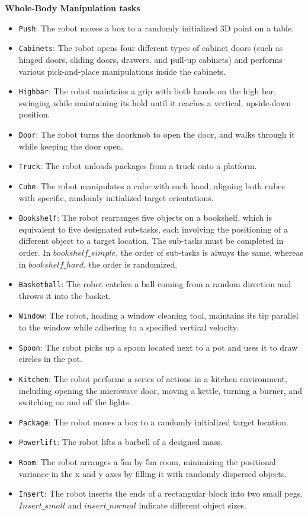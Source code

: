 \textbf{Whole-Body Manipulation tasks}
\begin{itemize}
    \item \texttt{Push}: The robot moves a box to a randomly initialized 3D point on a table.
    \item \texttt{Cabinets}: The robot opens four different types of cabinet doors (such as hinged doors, sliding doors, drawers, and pull-up cabinets) and performs various pick-and-place manipulations inside the cabinets.
    \item \texttt{Highbar}: The robot maintains a grip with both hands on the high bar, swinging while maintaining its hold until it reaches a vertical, upside-down position.
    \item \texttt{Door}: The robot turns the doorknob to open the door, and walks through it while keeping the door open.
    \item \texttt{Truck}: The robot unloads packages from a truck onto a platform.
    \item \texttt{Cube}: The robot manipulates a cube with each hand, aligning both cubes with specific, randomly initialized target orientations.
    \item \texttt{Bookshelf}: The robot rearranges five objects on a bookshelf, which is equivalent to five designated sub-tasks, each involving the positioning of a different object to a target location. The sub-tasks must be completed in order. In $bookshelf\_simple$, the order of sub-tasks is always the same, whereas in $bookshelf\_hard$, the order is randomized.
    \item \texttt{Basketball}: The robot catches a ball coming from a random direction and throws it into the basket.
    \item \texttt{Window}: The robot, holding a window cleaning tool, maintains its tip parallel to the window while adhering to a specified vertical velocity.
    \item \texttt{Spoon}: The robot picks up a spoon located next to a pot and uses it to draw circles in the pot.
    \item \texttt{Kitchen}: The robot performs a series of actions in a kitchen environment, including opening the microwave door, moving a kettle, turning a burner, and switching on and off the lights.
    \item \texttt{Package}: The robot moves a box to a randomly initialized target location.
    \item \texttt{Powerlift}: The robot lifts a barbell of a designed mass.
    \item \texttt{Room}: The robot arranges a 5m by 5m room, minimizing the positional variance in the x and y axes by filling it with randomly dispersed objects.
    \item \texttt{Insert}: The robot inserts the ends of a rectangular block into two small pegs. $Insert\_small$ and $insert\_normal$ indicate different object sizes.
\end{itemize}

